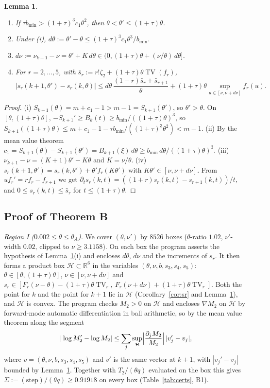\documentclass[11pt]{amsart}
\newtheorem{lemma}[theorem]{Lemma}
\theoremstyle{definition}
\theoremstyle{remark}
\numberwithin{equation}{section}
\newcommand{\RR}{\mathbb{R}}
\newcommand{\TV}{\operatorname{TV}}
\begin{document}
\begin{lemma}\label{lem:B1}
\begin{enumerate}[label=(\roman*)]
\item If $\tau b_{\min}>(1+\tau)^3c_1\theta^2$, then $\theta<\theta'\le(1+\tau)\theta$.
\item Under (i), $d\theta:=\theta'-\theta\le(1+\tau)^3c_1\theta^3/b_{\min}$.
\item $d\nu:=\nu_{k+1}-\nu=\theta'+K\,d\theta\in\bigl(0,(1+\tau)\theta+(\nu/\theta)\,d\theta\bigr]$.
\item For $r=2,\dots,5$, with $\bar s_r:=r!\zeta_2+(1+\tau)\theta\TV(f_r)$,
\[
  |s_r(k+1,\theta')-s_r(k,\theta)|\le d\theta\,\frac{(1+r)\bar s_r+\bar s_{r+1}}{\theta}+(1+\tau)\theta\sup_{u\in[\nu,\nu+d\nu]}f_r(u).
\]
\end{enumerate}
\end{lemma}

\begin{proof}
(i) $S_{k+1}(\theta)=m+c_1-1>m-1=S_{k+1}(\theta')$, so $\theta'>\theta$. On $[\theta,(1+\tau)\theta]$,
$-S_{k+1}'\ge B_k(t)\ge b_{\min}/((1+\tau)\theta)^3$, so $S_{k+1}((1+\tau)\theta)\le m+c_1-1-\tau b_{\min}/((1+\tau)^3\theta^2)<m-1$.
(ii) By the mean value theorem $c_1=S_{k+1}(\theta)-S_{k+1}(\theta')=B_{k+1}(\xi)\,d\theta\ge b_{\min}\,d\theta/((1+\tau)\theta)^3$.
(iii) $\nu_{k+1}-\nu=(K+1)\theta'-K\theta$ and $K=\nu/\theta$.
(iv) $s_r(k+1,\theta')=s_r(k,\theta')+\theta'f_r(K\theta')$ with $K\theta'\in[\nu,\nu+d\nu]$. From $uf_r'=rf_r-f_{r+1}$ we get
$\partial_ts_r(k,t)=((1+r)s_r(k,t)-s_{r+1}(k,t))/t$, and $0\le s_r(k,t)\le\bar s_r$ for $t\le(1+\tau)\theta$.
\end{proof}

\subsection{Proof of Theorem B}
\emph{Region I ($0.002\le\theta\le\theta_A$).} We cover $(\theta,\nu')$ by $8526$ boxes ($\theta$-ratio $1.02$, $\nu'$-width $0.02$, clipped to
$\nu\ge3.1158$). On each box the program asserts the hypothesis of Lemma~\ref{lem:B1}(i) and encloses $d\theta$, $d\nu$ and the
increments of $s_r$. It then forms a product box $\mathcal H\subset\RR^6$ in the variables $(\theta,\nu,b,s_3,s_4,s_5)$:
$\theta\in[\theta,(1+\tau)\theta]$, $\nu\in[\nu,\nu+d\nu]$ and
$s_r\in[F_r(\nu-\theta)-(1+\tau)\theta\TV_r,\ F_r(\nu+d\nu)+(1+\tau)\theta\TV_r]$. Both the point for $k$ and the point for $k+1$ lie in
$\mathcal H$ (Corollary~\ref{cor:sr} and Lemma~\ref{lem:B1}), and $\mathcal H$ is convex. The program checks $M_2>0$ on $\mathcal H$ and
encloses $\nabla M_2$ on $\mathcal H$ by forward-mode automatic differentiation in ball arithmetic, so by the mean value theorem along the
segment
\[
  |\log M_2'-\log M_2|\le\sum_j\sup_{\mathcal H}\Bigl|\frac{\partial_jM_2}{M_2}\Bigr|\,|v_j'-v_j|,
\]
where $v=(\theta,\nu,b,s_3,s_4,s_5)$ and $v'$ is the same vector at $k+1$, with $|v_j'-v_j|$ bounded by Lemma~\ref{lem:B1}. Together with $T_2/(\theta q)$ evaluated on the box this gives
$\Sigma:=(\text{step})/(\theta q)\ge0.91918$ on every box (Table~\ref{tab:certs}, B1).
\end{document}
